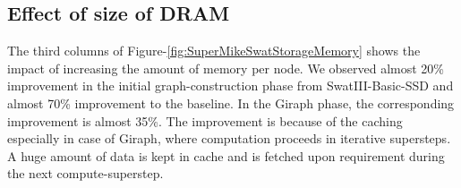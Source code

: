 \documentclass[conference]{IEEEtran}
\begin{document}
\subsection {Effect of size of DRAM} \label{EffectOfDRAM}
The third columns of Figure-\ref{fig:SuperMikeSwatStorageMemory} shows the impact of increasing the amount of memory per node. 
We observed almost 20\% improvement in the initial graph-construction phase from SwatIII-Basic-SSD and almost 70\% improvement to the baseline. %
In the Giraph phase, the corresponding improvement is almost 35\%. 
The improvement is because of the caching especially in case of Giraph, where computation proceeds in iterative supersteps. A huge amount of data is kept in cache and is fetched upon requirement during the next compute-superstep.
\end{document}
